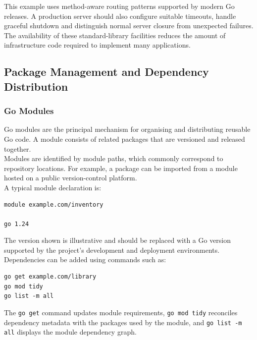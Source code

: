 This example uses method-aware routing patterns supported by modern Go releases. A production server should also configure suitable timeouts, handle graceful shutdown and distinguish normal server closure from unexpected failures.\\

The availability of these standard-library facilities reduces the amount of infrastructure code required to implement many applications.

\subsection{Package Management and Dependency Distribution}

\subsubsection{Go Modules}

Go modules are the principal mechanism for organising and distributing reusable Go code. A module consists of related packages that are versioned and released together.\\

Modules are identified by module paths, which commonly correspond to repository locations. For example, a package can be imported from a module hosted on a public version-control platform.\\

A typical module declaration is:

\begin{lstlisting}
module example.com/inventory

go 1.24
\end{lstlisting}

The version shown is illustrative and should be replaced with a Go version supported by the project's development and deployment environments.\\

Dependencies can be added using commands such as:

\begin{lstlisting}
go get example.com/library
go mod tidy
go list -m all
\end{lstlisting}

The \texttt{go get} command updates module requirements, \texttt{go mod tidy} reconciles dependency metadata with the packages used by the module, and \texttt{go list -m all} displays the module dependency graph.\\

